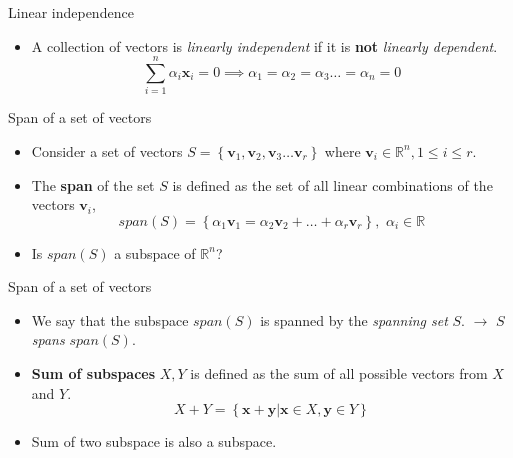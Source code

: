 \documentclass[aspectratio=169]{beamer}
\let\olditem\item
\renewcommand{\item}{\setlength{\itemsep}{\fill}\olditem}
\begin{document}
\begin{frame}[t]{Linear independence}
\begin{itemize}  
  \item A collection of vectors is \textit{linearly independent} if it is \textbf{not} \textit{linearly dependent}.
  $$ \sum_{i=1}^n\alpha_i\mathbf{x}_i = 0 \implies \alpha_1=\alpha_2=\alpha_3\ldots=\alpha_n = 0$$
\end{itemize}
\end{frame}


\begin{frame}[t]{Span of a set of vectors}
\begin{itemize}
    \item Consider a set of vectors $S = \left\{\mathbf{v}_1, \mathbf{v}_2, \mathbf{v}_3 \ldots \mathbf{v}_r\right\}$ where $\mathbf{v}_i \in \mathbb{R}^n, 1 \leq i \leq r$.
    \item The \textbf{span} of the set $S$ is defined as the set of all linear combinations of the vectors $\mathbf{v}_i$,
    \[ span\left(S\right) = \left\{\alpha_1\mathbf{v}_1 = \alpha_2\mathbf{v}_2 + \ldots + \alpha_r\mathbf{v}_r\right\}, \,\, \alpha_i \in \mathbb{R} \]
    \item Is $span\left(S\right)$ a subspace of $\mathbb{R}^n$?
\end{itemize}
\end{frame}


\begin{frame}[t]{Span of a set of vectors}
\begin{itemize}
    \item We say that the subspace $span\left(S\right)$ is spanned by the \textit{spanning set} $S$. $\longrightarrow$ $S$ \textit{spans} $span\left(S\right)$.
    \item \textbf{Sum of subspaces} $X, Y$ is defined as the sum of all possible vectors from $X$ and $Y$.
    \[ X + Y = \left\{\mathbf{x} + \mathbf{y} \left|\right. \mathbf{x} \in X, \mathbf{y} \in Y\right\} \]
    \item Sum of two subspace is also a subspace.
\end{itemize}
\end{frame}
\end{document}
